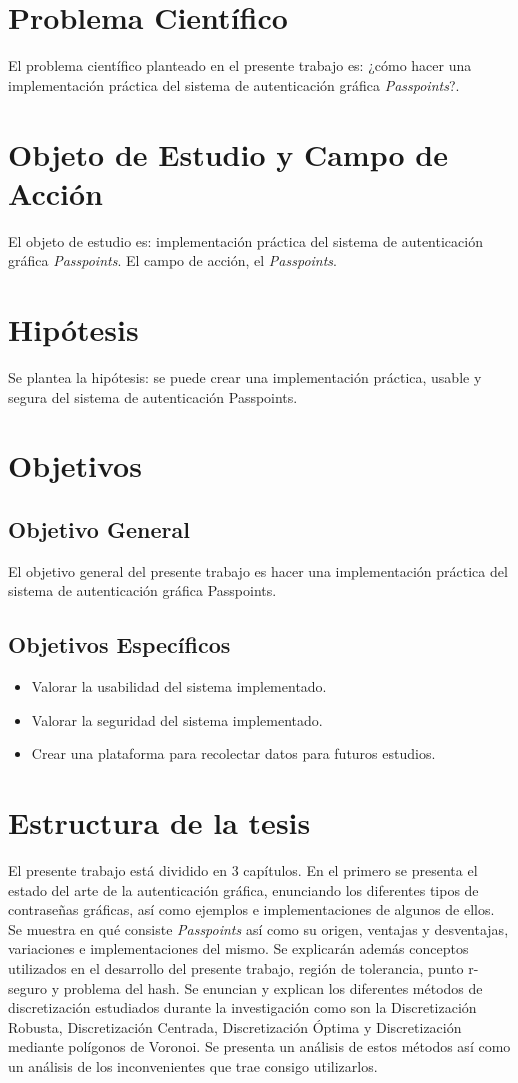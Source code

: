 \section*{Problema Científico}
El problema científico planteado en el presente trabajo es: ¿cómo hacer una implementación práctica del sistema de autenticación gráfica \textit{Passpoints}?.
\section*{Objeto de Estudio y Campo de Acción}
El objeto de estudio es: implementación práctica del sistema de autenticación gráfica  \textit{Passpoints}. 
El campo de acción, el \textit{Passpoints}.
\section*{Hipótesis}
Se plantea la hipótesis: se puede crear una implementación práctica, usable y segura
del sistema de autenticación Passpoints.

\section*{Objetivos}
\subsection*{Objetivo General}
El objetivo general del presente trabajo es
hacer una implementación práctica del sistema de autenticación gráfica Passpoints.

\subsection*{Objetivos Específicos}
\begin{itemize}
	\item  Valorar la usabilidad del sistema implementado.
	\item Valorar la seguridad del sistema implementado.
	\item  Crear una plataforma para recolectar datos para futuros estudios.
\end{itemize}


\section*{Estructura de la tesis}
El presente trabajo está dividido en 3 capítulos.
En el primero se presenta el estado del arte de la autenticación gráfica, enunciando los diferentes tipos de contraseñas gráficas, así como ejemplos e implementaciones de algunos de ellos. Se muestra en qué consiste \textit{Passpoints} así como su origen, ventajas y desventajas, variaciones e implementaciones del mismo. Se explicarán además conceptos utilizados en el desarrollo del presente trabajo, región de tolerancia, punto r-seguro y problema del hash. Se enuncian y explican los diferentes métodos de discretización estudiados durante la investigación como son la Discretización Robusta, Discretización Centrada, Discretización Óptima y Discretización mediante polígonos de Voronoi. Se presenta un análisis de estos métodos así como un análisis de los inconvenientes que trae consigo utilizarlos.


